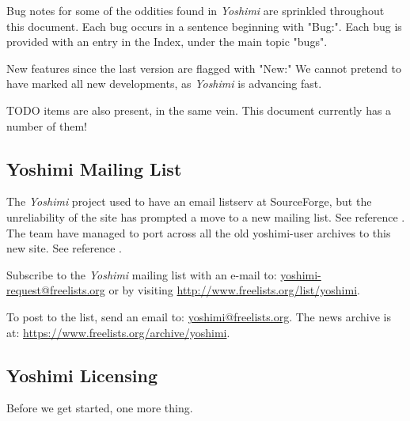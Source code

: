 \documentclass[
 11pt,
 twoside,
 a4paper,
 final                                 %
]{article}
\begin{document}
   Bug notes
   for some of the oddities found in \textsl{Yoshimi} are
   sprinkled throughout this document.
   Each bug occurs in a sentence beginning with "Bug:".
   Each bug is provided with an entry in the Index, under the
   main topic "bugs".

   New features
   since the last version are flagged with "New:"  We cannot pretend to have
   marked all new developments, as \textsl{Yoshimi} is advancing fast.

   TODO items are also present, in the same vein.  This document currently has
   a number of them!

\subsection{Yoshimi Mailing List}
\label{subsec:introduction_mailing_list}

   The \textsl{Yoshimi} project used to have an email listserv at
   SourceForge, but the unreliability of the site has prompted a move to a
   new mailing list.  See reference \cite{yoshiminews}.  The team have
   managed to port across all the old yoshimi-user archives to this new
   site.  See reference \cite{yoshiminewsarchive}.

   Subscribe to the \textsl{Yoshimi} mailing list with an e-mail to:
   \url{yoshimi-request@freelists.org} or by visiting 
   \url{http://www.freelists.org/list/yoshimi}.

   To post to the list, send an email to: \url{yoshimi@freelists.org}.
   The news archive is at: \url{https://www.freelists.org/archive/yoshimi}.

\subsection{Yoshimi Licensing}
\label{subsec:introduction_yoshimi_licensing}

   Before we get started, one more thing.
\end{document}
